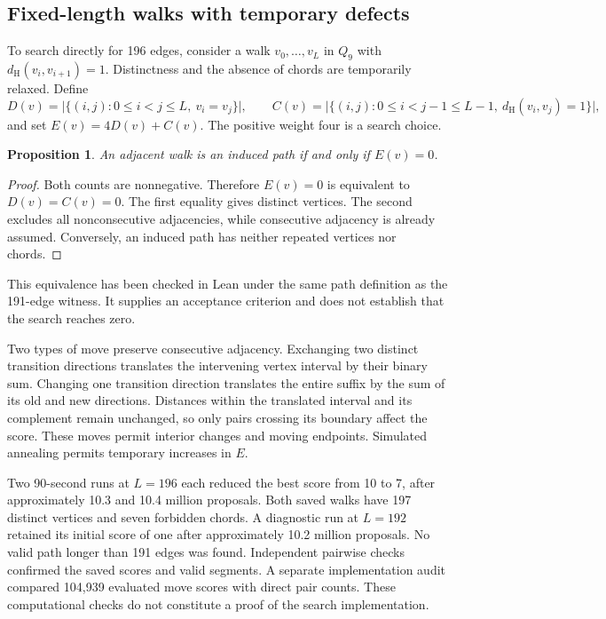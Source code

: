 \documentclass[11pt,a4paper]{article}
\newtheorem{proposition}[theorem]{Proposition}
\theoremstyle{definition}
\theoremstyle{remark}
\newcommand{\Q}{Q}
\newcommand{\Ham}{d_{\mathrm H}}
\begin{document}
\subsection{Fixed-length walks with temporary defects}
To search directly for 196 edges, consider a walk $v_0,\ldots,v_L$ in $\Q_9$ with $\Ham(v_i,v_{i+1})=1$. Distinctness and the absence of chords are temporarily relaxed. Define
\[
D(v)=\bigl|\{(i,j):0\le i<j\le L,\ v_i=v_j\}\bigr|,
\qquad
C(v)=\bigl|\{(i,j):0\le i<j-1\le L-1,\ \Ham(v_i,v_j)=1\}\bigr|,
\]
and set $E(v)=4D(v)+C(v)$. The positive weight four is a search choice.

\begin{proposition}\label{prop:zero-defect}
An adjacent walk is an induced path if and only if $E(v)=0$.
\end{proposition}
\begin{proof}
Both counts are nonnegative. Therefore $E(v)=0$ is equivalent to $D(v)=C(v)=0$. The first equality gives distinct vertices. The second excludes all nonconsecutive adjacencies, while consecutive adjacency is already assumed. Conversely, an induced path has neither repeated vertices nor chords.
\end{proof}
This equivalence has been checked in Lean under the same path definition as the 191-edge witness. It supplies an acceptance criterion and does not establish that the search reaches zero.

Two types of move preserve consecutive adjacency. Exchanging two distinct transition directions translates the intervening vertex interval by their binary sum. Changing one transition direction translates the entire suffix by the sum of its old and new directions. Distances within the translated interval and its complement remain unchanged, so only pairs crossing its boundary affect the score. These moves permit interior changes and moving endpoints. Simulated annealing permits temporary increases in $E$.

Two 90-second runs at $L=196$ each reduced the best score from 10 to 7, after approximately 10.3 and 10.4 million proposals. Both saved walks have 197 distinct vertices and seven forbidden chords. A diagnostic run at $L=192$ retained its initial score of one after approximately 10.2 million proposals. No valid path longer than 191 edges was found. Independent pairwise checks confirmed the saved scores and valid segments. A separate implementation audit compared 104,939 evaluated move scores with direct pair counts. These computational checks do not constitute a proof of the search implementation.
\end{document}
